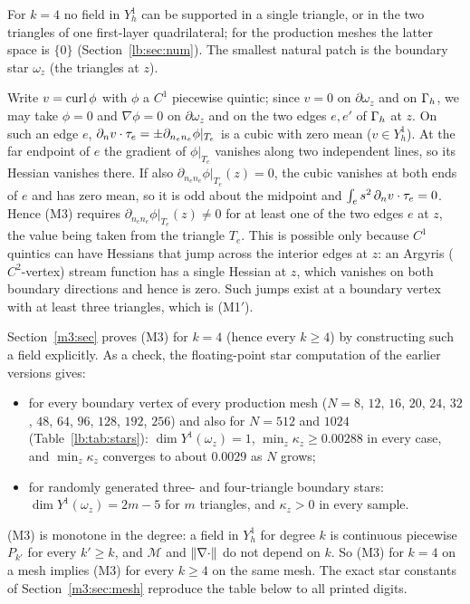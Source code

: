 \begin{remark}[$k=4$]\label{lb:k4}
For $k=4$ no field in $Y_h^1$ can be supported in a single triangle, or in the two triangles of one first-layer quadrilateral; for the production meshes the latter space is $\{0\}$ (Section~\ref{lb:sec:num}). The smallest natural patch is the boundary star $\omega_z$ (the triangles at $z$).

Write $v=\operatorname{curl}\phi$ with $\phi$ a $C^1$ piecewise quintic; since $v=0$ on $\partial\omega_z$ and on $\Gamma_h$, we may take $\phi=0$ and $\nabla\phi=0$ on $\partial\omega_z$ and on the two edges $e,e'$ of $\Gamma_h$ at $z$. On such an edge $e$, $\partial_n v\cdot\tau_e=\pm\partial_{n_en_e}\phi|_{T_e}$ is a cubic with zero mean ($v\in Y_h^1$). At the far endpoint of $e$ the gradient of $\phi|_{T_e}$ vanishes along two independent lines, so its Hessian vanishes there. If also $\partial_{n_en_e}\phi|_{T_e}(z)=0$, the cubic vanishes at both ends of $e$ and has zero mean, so it is odd about the midpoint and $\int_es^2\,\partial_n v\cdot\tau_e=0$. Hence (M3) requires $\partial_{n_en_e}\phi|_{T_e}(z)\ne0$ for at least one of the two edges $e$ at $z$, the value being taken from the triangle $T_e$. This is possible only because $C^1$ quintics can have Hessians that jump across the interior edges at $z$: an Argyris ($C^2$-vertex) stream function has a single Hessian at $z$, which vanishes on both boundary directions and hence is zero. Such jumps exist at a boundary vertex with at least three triangles, which is (M1$'$).

Section~\ref{m3:sec} proves (M3) for $k=4$ (hence every $k\ge4$) by constructing such a field explicitly. As a check, the floating-point star computation of the earlier versions gives:
\begin{itemize}
\item for every boundary vertex of every production mesh ($N=8$, $12$, $16$, $20$, $24$, $32$, $48$, $64$, $96$, $128$, $192$, $256$) and also for $N=512$ and $1024$ (Table~\ref{lb:tab:stars}): $\dim Y^1(\omega_z)=1$, $\min_z\kappa_z\ge0.00288$ in every case, and $\min_z\kappa_z$ converges to about $0.0029$ as $N$ grows;
\item for randomly generated three- and four-triangle boundary stars: $\dim Y^1(\omega_z)=2m-5$ for $m$ triangles, and $\kappa_z>0$ in every sample.
\end{itemize}
(M3) is monotone in the degree: a field in $Y_h^1$ for degree $k$ is continuous piecewise $P_{k'}$ for every $k'\ge k$, and $\mathcal M$ and $\lVert \nabla\cdot\rVert$ do not depend on $k$. So (M3) for $k=4$ on a mesh implies (M3) for every $k\ge4$ on the same mesh. The exact star constants of Section~\ref{m3:sec:mesh} reproduce the table below to all printed digits.
\end{remark}

